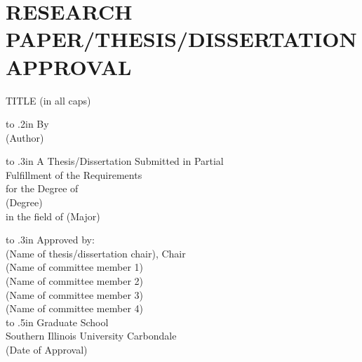 

\chapter*{RESEARCH PAPER/THESIS/DISSERTATION APPROVAL} 


\thispagestyle{empty}

\begin{center}
\medskip
TITLE (in all caps)

\vbox to .2in{}
By \\
(Author)

\vbox to .3in{}
A Thesis/Dissertation Submitted in Partial \\
Fulfillment of the Requirements \\
for the Degree of \\
(Degree) \\
in the field of (Major)

\vbox to .3in{}
Approved by: \\
(Name of thesis/dissertation chair), Chair \\
(Name of committee member 1) \\
(Name of committee member 2) \\
(Name of committee member 3) \\
(Name of committee member 4) \\

\baselineskip=14pt
\vbox to .5in{}
Graduate School \\
Southern Illinois University Carbondale \\
(Date of Approval)
\end{center}

\baselineskip=24pt
\newpage

